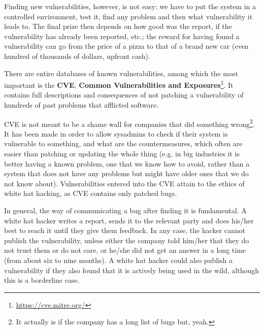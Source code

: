 Finding new vulnerabilities, however, is not easy: we have to put the system in a controlled environment, test it, find any problem and then what vulnerability it leads to. The final prize then depends on how good was the report, if the vulnerability has already been reported, etc.; the reward for having found a vulnerability can go from the price of a pizza to that of a brand new car (even hundred of thousands of dollars, upfront cash).

There are entire databases of known vulnerabilities, among which the most important is the \textbf{CVE}, \textbf{Common Vulnerabilities and Exposures}\footnote{\url{https://cve.mitre.org/}}. It contains full descriptions and consequences of not patching a vulnerability of hundreds of past problems that afflicted software.

CVE is not meant to be a shame wall for companies that did something wrong\footnote{It actually is if the company has a long list of bugs but, yeah.}. It has been made in order to allow sysadmins to check if their system is vulnerable to something, and what are the countermeasures, which often are easier than patching or updating the whole thing (e.g. in big industries it is better having a known problem, one that we know how to avoid, rather than a system that does not have any problems but might have older ones that we do not know about). Vulnerabilities entered into the CVE attain to the ethics of white hat hacking, as CVE contains only patched bugs.

In general, the way of communicating a bug after finding it is fundamental. A white hat hacker writes a report, sends it to the relevant party and does his/her best to reach it until they give them feedback. In any case, the hacker cannot publish the vulnerability, unless either the company told him/her that they do not trust them or do not care, or he/she did not get an answer in a long time (from about six to nine months). A white hat hacker could also publish a vulnerability if they also found that it is actively being used in the wild, although this is a borderline case.